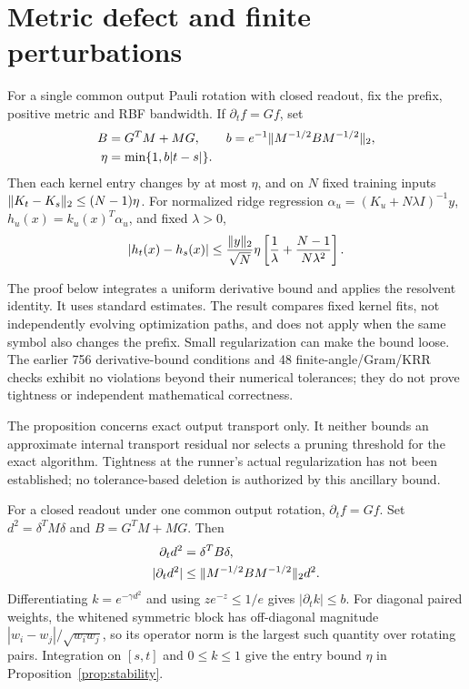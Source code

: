 \section{Metric defect and finite perturbations}
\label{app:bound}
\begin{proposition}
\label{prop:stability}
For a single common output Pauli rotation with closed readout, fix the
prefix, positive metric and RBF bandwidth. If $\partial_t f=Gf$, set
\begin{align}
 B&=G^TM+MG,\qquad
 b=e^{-1}\lVert M^{-1/2}BM^{-1/2}\rVert_2,\\
 \eta&=\min\{1,b|t-s|\}.
\end{align}
Then each kernel entry changes by at most $\eta$, and on $N$ fixed
training inputs $\lVert K_t-K_s\rVert_2\leq(N-1)\eta$.
For normalized ridge regression $\alpha_u=(K_u+N\lambda I)^{-1}y$,
$h_u(x)=k_u(x)^T\alpha_u$, and fixed $\lambda>0$,
\begin{equation}
 |h_t(x)-h_s(x)|\leq\frac{\lVert y\rVert_2}{\sqrt N}\eta
 \left[\frac1\lambda+\frac{N-1}{N\lambda^2}\right].\label{eq:krr}
\end{equation}
\end{proposition}
The proof below integrates a uniform derivative
bound and applies the resolvent identity. It uses standard estimates.
The result compares fixed kernel fits, not independently evolving
optimization paths, and does not apply when the same symbol also
changes the prefix. Small regularization can make the bound loose.
The earlier 756 derivative-bound conditions and 48 finite-angle/Gram/KRR
checks exhibit no violations beyond their numerical tolerances; they
do not prove tightness or independent mathematical correctness.


The proposition concerns exact output transport only. It neither bounds
an approximate internal transport residual nor selects a pruning
threshold for the exact algorithm. Tightness at the runner's actual
regularization has not been established; no tolerance-based deletion
is authorized by this ancillary bound.

For a closed readout under one common output rotation,
$\partial_t f=Gf$. Set $d^2=\delta^TM\delta$ and
$B=G^TM+MG$. Then
\begin{align}
 \partial_t d^2&=\delta^TB\delta,\\
 |\partial_t d^2|&\leq\lVert M^{-1/2}BM^{-1/2}\rVert_2d^2.
\end{align}
Differentiating $k=e^{-\gamma d^2}$ and using $ze^{-z}\leq1/e$
gives $|\partial_t k|\leq b$. For diagonal paired weights, the
whitened symmetric block has off-diagonal magnitude
$|w_i-w_j|/\sqrt{w_iw_j}$, so its operator norm is the largest
such quantity over rotating pairs. Integration on $[s,t]$ and
$0\leq k\leq1$ give the entry bound $\eta$ in
Proposition~\ref{prop:stability}.

